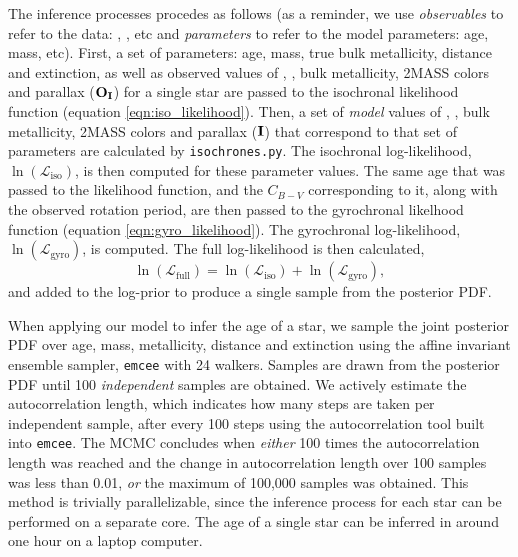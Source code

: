 The inference processes procedes as follows (as a reminder, we use {\it
observables} to refer to the data: \teff, \logg, etc and {\it parameters} to
refer to the model parameters: age, mass, etc).
First, a set of parameters: age, mass, true bulk metallicity, distance and
extinction, as well as observed values of \teff, \logg, bulk metallicity,
2MASS colors and parallax (${\bf O_I}$) for a single star are passed to the
isochronal likelihood function (equation \ref{eqn:iso_likelihood}).
Then, a set of {\it model} values of \teff, \logg, bulk metallicity, 2MASS
colors and parallax (${\bf I}$) that correspond to that set of parameters are
calculated by {\tt isochrones.py}.
The isochronal log-likelihood, $\ln(\mathcal{L}_{\mathrm{iso}})$, is then
computed for these parameter values.
The same age that was passed to the likelihood function, and the $C_{B-V}$
corresponding to it, along with the observed rotation period, are then passed
to the gyrochronal likelhood function (equation \ref{eqn:gyro_likelihood}).
The gyrochronal log-likelihood, $\ln(\mathcal{L}_{\mathrm{gyro}})$, is
computed.
The full log-likelihood is then calculated,
\begin{equation}
\ln(\mathcal{L}_{\mathrm{full}})
= \ln(\mathcal{L}_{\mathrm{iso}}) + \ln(\mathcal{L}_{\mathrm{gyro}}),
\label{eqn:both_likelihood}
\end{equation}
and added to the log-prior to produce a single sample from the posterior PDF.

When applying our model to infer the age of a star, we sample the joint
posterior PDF over age, mass, metallicity, distance and extinction using the
affine invariant ensemble sampler, {\tt emcee} \citep{foreman-mackey2013} with
24 walkers.
Samples are drawn from the posterior PDF until 100 {\it independent} samples
are obtained.
We actively estimate the autocorrelation length, which indicates how many
steps are taken per independent sample, after every 100 steps using the
autocorrelation tool built into {\tt emcee}.
The MCMC concludes when {\it either} 100 times the autocorrelation length was
reached and the change in autocorrelation length over 100 samples was less
than 0.01, {\it or} the maximum of 100,000 samples was obtained.
This method is trivially parallelizable, since the inference process for each
star can be performed on a separate core.
The age of a single star can be inferred in around one hour on a laptop
computer.

